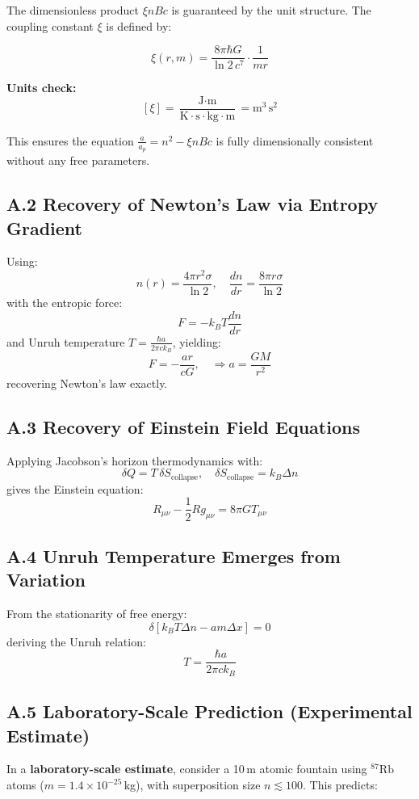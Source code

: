 \documentclass[12pt]{article}
\begin{document}
The dimensionless product \( \xi n B c \) is guaranteed by the unit structure. The coupling constant \( \xi \) is defined by:

\[
\boxed{ \xi(r, m) = \frac{8\pi \hbar G}{\ln 2 \, c^7} \cdot \frac{1}{mr} }
\]

\noindent
\textbf{Units check:}  
\[
[\xi] = \frac{\text{J} \cdot \text{m}}{\text{K} \cdot \text{s} \cdot \text{kg} \cdot \text{m}} = \text{m}^3\,\text{s}^2
\]

\noindent
This ensures the equation \( \frac{a}{a_p} = n^2 - \xi n B c \) is fully dimensionally consistent without any free parameters.

\subsection*{A.2 Recovery of Newton’s Law via Entropy Gradient}
Using:
\[
n(r) = \frac{4\pi r^2 \sigma}{\ln 2}, \quad \frac{dn}{dr} = \frac{8\pi r \sigma}{\ln 2}
\]
with the entropic force:
\[
F = -k_B T \frac{dn}{dr}
\]
and Unruh temperature \( T = \frac{\hbar a}{2\pi c k_B} \), yielding:
\[
F = -\frac{a r}{c G}, \quad \Rightarrow a = \frac{GM}{r^2}
\]
recovering Newton's law exactly.

\subsection*{A.3 Recovery of Einstein Field Equations}
Applying Jacobson’s horizon thermodynamics with:
\[
\delta Q = T \, \delta S_{\text{collapse}}, \quad \delta S_{\text{collapse}} = k_B \Delta n
\]
gives the Einstein equation:
\[
R_{\mu\nu} - \frac{1}{2} R g_{\mu\nu} = 8\pi G T_{\mu\nu}
\]

\subsection*{A.4 Unruh Temperature Emerges from Variation}
From the stationarity of free energy:
\[
\delta \left[ k_B T \Delta n - a m \Delta x \right] = 0
\]
deriving the Unruh relation:
\[
T = \frac{\hbar a}{2\pi c k_B}
\]

\subsection*{A.5 Laboratory-Scale Prediction (Experimental Estimate)}

In a \textbf{laboratory-scale estimate}, consider a 10 m atomic fountain using \(^{87}\text{Rb}\) atoms (\( m = 1.4 \times 10^{-25} \) kg), with superposition size \( n \lesssim 100 \). This predicts:
\end{document}
